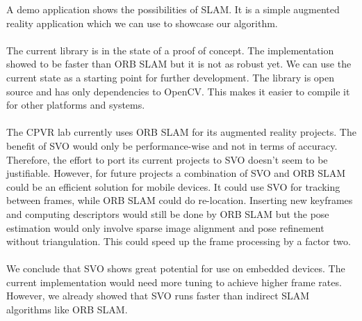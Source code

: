 \documentclass[11pt,a4paper,titlepage,oneside]{report}
\begin{document}
A demo application shows the possibilities of SLAM. It is a simple augmented reality application which we can use to showcase our algorithm.\\\\
The current library is in the state of a proof of concept. The implementation showed to be faster than ORB SLAM but it is not as robust yet. We can use the current state as a starting point for further development. The library is open source and has only dependencies to OpenCV. This makes it easier to compile it for other platforms and systems.\\\\
The CPVR lab currently uses ORB SLAM for its augmented reality projects. The benefit of SVO would only be performance-wise and not in terms of accuracy. Therefore, the effort to port its current projects to SVO doesn't seem to be justifiable. However, for future projects a combination of SVO and ORB SLAM could be an efficient solution for mobile devices. It could use SVO for tracking between frames, while ORB SLAM could do re-location. Inserting new keyframes and computing descriptors would still be done by ORB SLAM but the pose estimation would only involve sparse image alignment and pose refinement without triangulation. This could speed up the frame processing by a factor two.\\\\
We conclude that SVO shows great potential for use on embedded devices. The current implementation would need more tuning to achieve higher frame rates. However, we already showed that SVO runs faster than indirect SLAM algorithms like ORB SLAM.

\printbibliography
\end{document}
